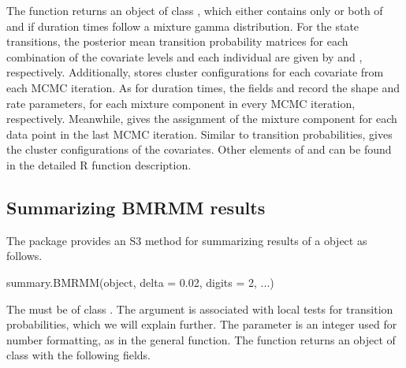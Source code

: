 The  function returns an object of class ,  which either contains only   or both of   and  if duration times follow a mixture gamma distribution. 
For the state transitions, the posterior mean transition probability matrices 
for each combination of the covariate levels and each individual are given by  and , respectively. 
Additionally,   stores  cluster configurations for each covariate from each MCMC iteration. 
%
%
As for duration times,   the fields  and  record the  shape  and rate parameters, for each mixture component in every MCMC iteration,  respectively.  
Meanwhile,  gives the assignment of the mixture component for each data point in the last MCMC iteration. 
Similar to transition probabilities,  gives the cluster configurations of the covariates. 
Other elements of  and  can be found in the detailed R function description. 

\subsection{Summarizing BMRMM results}

The  package provides an S3 method for summarizing results of a  object as follows. 

\begin{example}
summary.BMRMM(object, delta = 0.02, digits = 2, ...)
\end{example}

The  must be of class .  
The argument  is associated with local tests for transition probabilities, which we will explain further. 
The  parameter is an integer used for number formatting, as in the general  function.  
The  function returns an object of class  with the following fields. 


